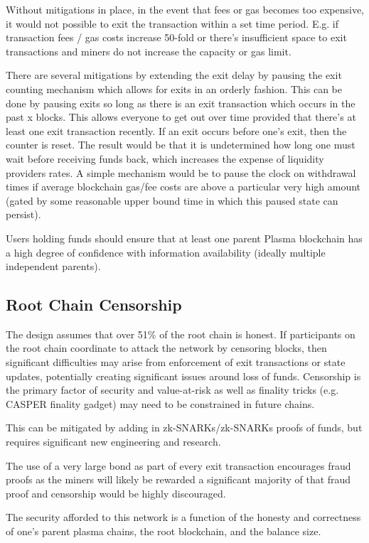 \documentclass[letterpaper, 11pt]{article}
\begin{document}
Without mitigations in place, in the event that fees or gas becomes too
expensive, it would not possible to exit the transaction within a set time
period. E.g. if transaction fees / gas costs increase 50-fold or there's
insufficient space to exit transactions and miners do not increase the capacity
or gas limit.

There are several mitigations by extending the exit delay by pausing the exit
counting mechanism which allows for exits in an orderly fashion. This can be
done by pausing exits so long as there is an exit transaction which occurs in
the past x blocks. This allows everyone to get out over time provided that
there's at least one exit transaction recently. If an exit occurs before one's
exit, then the counter is reset. The result would be that it is undetermined how
long one must wait before receiving funds back, which increases the expense of
liquidity providers rates. A simple mechanism would be to pause the clock on
withdrawal times if average blockchain gas/fee costs are above a particular very
high amount (gated by some reasonable upper bound time in which this paused
state can persist).

Users holding funds should ensure that at least one parent Plasma blockchain has
a high degree of confidence with information availability (ideally multiple
independent parents).

\subsection{Root Chain Censorship}

The design assumes that over 51\% of the root chain is honest. If participants
on the root chain coordinate to attack the network by censoring blocks, then
significant difficulties may arise from enforcement of exit transactions or
state updates, potentially creating significant issues around loss of funds.
Censorship is the primary factor of security and value-at-risk as well as
finality tricks (e.g. CASPER finality gadget) may need to be constrained in
future chains.

This can be mitigated by adding in zk-SNARKs/zk-SNARKs proofs of funds, but
requires significant new engineering and research.

The use of a very large bond as part of every exit transaction encourages fraud
proofs as the miners will likely be rewarded a significant majority of that
fraud proof and censorship would be highly discouraged.

The security afforded to this network is a function of the honesty and
correctness of one's parent plasma chains, the root blockchain, and the balance
size.
\end{document}
